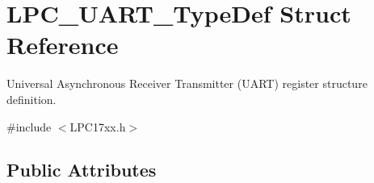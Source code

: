\hypertarget{struct_l_p_c___u_a_r_t___type_def}{\section{\-L\-P\-C\-\_\-\-U\-A\-R\-T\-\_\-\-Type\-Def \-Struct \-Reference}
\label{struct_l_p_c___u_a_r_t___type_def}
}


\-Universal \-Asynchronous \-Receiver \-Transmitter (\-U\-A\-R\-T) register structure definition.  




{\ttfamily \#include $<$\-L\-P\-C17xx.\-h$>$}

\subsection*{\-Public \-Attributes}
